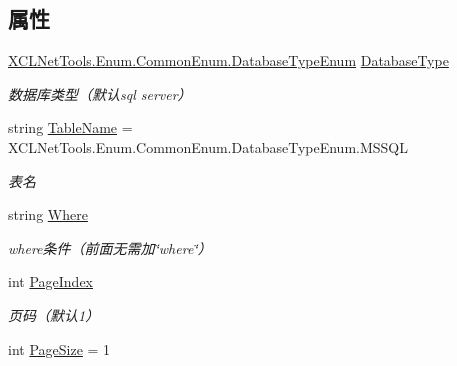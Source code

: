 \subsection*{属性}
\begin{DoxyCompactItemize}
\item 
\hyperlink{class_x_c_l_net_tools_1_1_enum_1_1_common_enum_a4c4edc085935542b75e6386cb261ab4b}{X\-C\-L\-Net\-Tools.\-Enum.\-Common\-Enum.\-Database\-Type\-Enum} \hyperlink{class_x_c_l_net_tools_1_1_entity_1_1_sql_pager_condition_entity_a58c76c39c2a5062a6377a3e0a550ec9c}{Database\-Type}
\begin{DoxyCompactList}\small\item\em 数据库类型（默认sql server） \end{DoxyCompactList}\item 
string \hyperlink{class_x_c_l_net_tools_1_1_entity_1_1_sql_pager_condition_entity_ac4a6c5b0eeef5c0ce63cd3aa15c91e15}{Table\-Name} = X\-C\-L\-Net\-Tools.\-Enum.\-Common\-Enum.\-Database\-Type\-Enum.\-M\-S\-S\-Q\-L
\begin{DoxyCompactList}\small\item\em 表名 \end{DoxyCompactList}\item 
string \hyperlink{class_x_c_l_net_tools_1_1_entity_1_1_sql_pager_condition_entity_a0201ec19db112ae1787225c4e03a9b43}{Where}
\begin{DoxyCompactList}\small\item\em where条件（前面无需加\char`\"{}where\char`\"{}） \end{DoxyCompactList}\item 
int \hyperlink{class_x_c_l_net_tools_1_1_entity_1_1_sql_pager_condition_entity_a1550964ce65f83eb6fcc061fef6774a6}{Page\-Index}
\begin{DoxyCompactList}\small\item\em 页码（默认1） \end{DoxyCompactList}\item 
int \hyperlink{class_x_c_l_net_tools_1_1_entity_1_1_sql_pager_condition_entity_aaac0f703651e83bd800ff4e90171300a}{Page\-Size} = 1

\end{DoxyCompactItemize}
